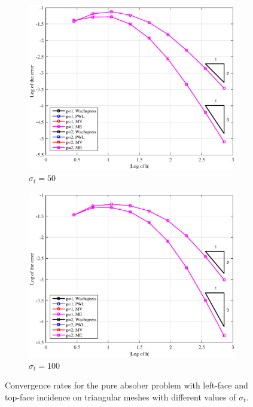\begin{figure}
{\begin{subfigure}[b]{0.485\textwidth}
	\end{subfigure}
}
\vspace{1cm}
{
	\begin{subfigure}[b]{0.485\textwidth}
		\centering
		\label{subfig::PA_LeftTop_Tri_sig50}
		\includegraphics[width=\textwidth]{figures/sec_BF/PAErr_LeftTop_Tri_sig50.eps}
	\caption{$\sigma_t = 50$}
	\end{subfigure}
	\hfill
	\begin{subfigure}[b]{0.485\textwidth}
		\centering
		\label{subfig::PA_LeftTop_Tri_sig100}
		\includegraphics[width=\textwidth]{figures/sec_BF/PAErr_LeftTop_Tri_sig100.eps}
	\caption{$\sigma_t = 100$}
	\end{subfigure}
}
\caption{Convergence rates for the pure absober problem with left-face and top-face incidence on triangular meshes with different values of $\sigma_t$.}
\label{fig::BF_Results_PA_LeftTop_Tri}
\end{figure}

